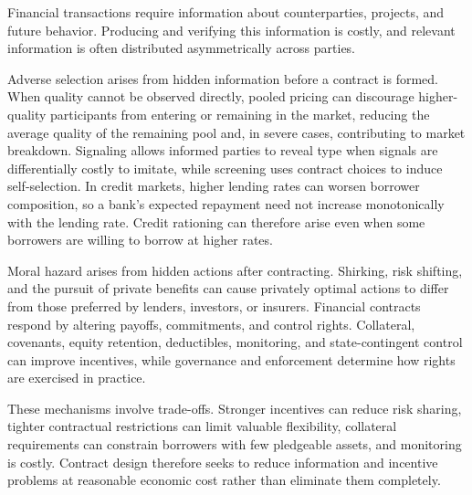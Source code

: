 
Financial transactions require information about counterparties, projects, and future behavior. Producing and verifying this information is costly, and relevant information is often distributed asymmetrically across parties.

Adverse selection arises from hidden information before a contract is formed. When quality cannot be observed directly, pooled pricing can discourage higher-quality participants from entering or remaining in the market, reducing the average quality of the remaining pool and, in severe cases, contributing to market breakdown. Signaling allows informed parties to reveal type when signals are differentially costly to imitate, while screening uses contract choices to induce self-selection. In credit markets, higher lending rates can worsen borrower composition, so a bank's expected repayment need not increase monotonically with the lending rate. Credit rationing can therefore arise even when some borrowers are willing to borrow at higher rates.

Moral hazard arises from hidden actions after contracting. Shirking, risk shifting, and the pursuit of private benefits can cause privately optimal actions to differ from those preferred by lenders, investors, or insurers. Financial contracts respond by altering payoffs, commitments, and control rights. Collateral, covenants, equity retention, deductibles, monitoring, and state-contingent control can improve incentives, while governance and enforcement determine how rights are exercised in practice.

These mechanisms involve trade-offs. Stronger incentives can reduce risk sharing, tighter contractual restrictions can limit valuable flexibility, collateral requirements can constrain borrowers with few pledgeable assets, and monitoring is costly. Contract design therefore seeks to reduce information and incentive problems at reasonable economic cost rather than eliminate them completely.


